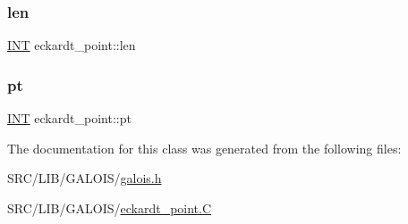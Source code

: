 \subsubsection{\texorpdfstring{len}{len}}
{\footnotesize\ttfamily \mbox{\hyperlink{galois_8h_a09fddde158a3a20bd2dcadb609de11dc}{I\+NT}} eckardt\+\_\+point\+::len}

\mbox{\label{classeckardt__point_a223c9de699c4507c2cf86c8b164163e3}} 
\subsubsection{\texorpdfstring{pt}{pt}}
{\footnotesize\ttfamily \mbox{\hyperlink{galois_8h_a09fddde158a3a20bd2dcadb609de11dc}{I\+NT}} eckardt\+\_\+point\+::pt}



The documentation for this class was generated from the following files\+:\begin{DoxyCompactItemize}
\item 
S\+R\+C/\+L\+I\+B/\+G\+A\+L\+O\+I\+S/\mbox{\hyperlink{galois_8h}{galois.\+h}}\item 
S\+R\+C/\+L\+I\+B/\+G\+A\+L\+O\+I\+S/\mbox{\hyperlink{eckardt__point_8_c}{eckardt\+\_\+point.\+C}}\end{DoxyCompactItemize}
